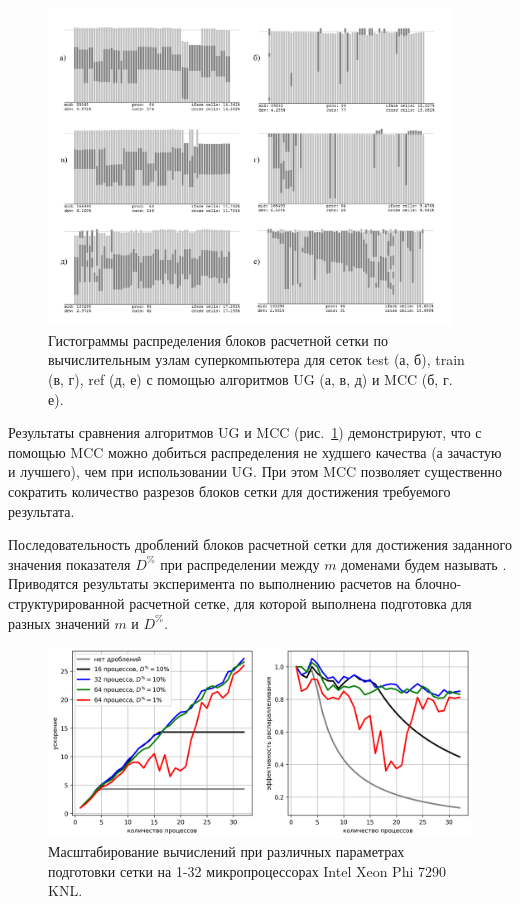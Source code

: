 \documentclass[a4paper,14pt]{extarticle}                     %
\theoremstyle{plain}                                         %
\begin{document}
\begin{figure}[!ht]
\centering
\includegraphics[width=0.95\textwidth]{./pics/text_2_withcut/2-merged-pic.pdf}
\singlespacing
\caption{Гистограммы распределения блоков расчетной сетки по вычислительным узлам суперкомпьютера для сеток test (а, б), train (в, г), ref (д, е) с помощью алгоритмов UG (а, в, д) и MCC (б, г. е).}
\label{fig:text_2_withcut_2_merged_pic}
\end{figure}

Результаты сравнения алгоритмов UG и MCC (рис.~\ref{fig:text_2_withcut_2_merged_pic}) демонстрируют, что с помощью MCC можно добиться распределения не худшего качества (а зачастую и лучшего), чем при использовании UG.
При этом MCC позволяет существенно сократить количество разрезов блоков сетки для достижения требуемого результата.

Последовательность дроблений блоков расчетной сетки для достижения заданного значения показателя $D^{\%}$ при распределении между $m$ доменами будем называть .
Приводятся результаты эксперимента по выполнению расчетов на блочно-структурированной расчетной сетке, для которой выполнена подготовка для разных значений $m$ и $D^{\%}$.

\begin{figure}[ht]
\centering
\includegraphics[width=1.0\textwidth]{./pics/text_2_withcut/scaling3.png}
\singlespacing
\caption{Масштабирование вычислений при различных параметрах подготовки сетки на 1-32 микропроцессорах Intel Xeon Phi 7290 KNL.}
\label{fig:text_2_withcut_scaling3}
\end{figure}
\end{document}

